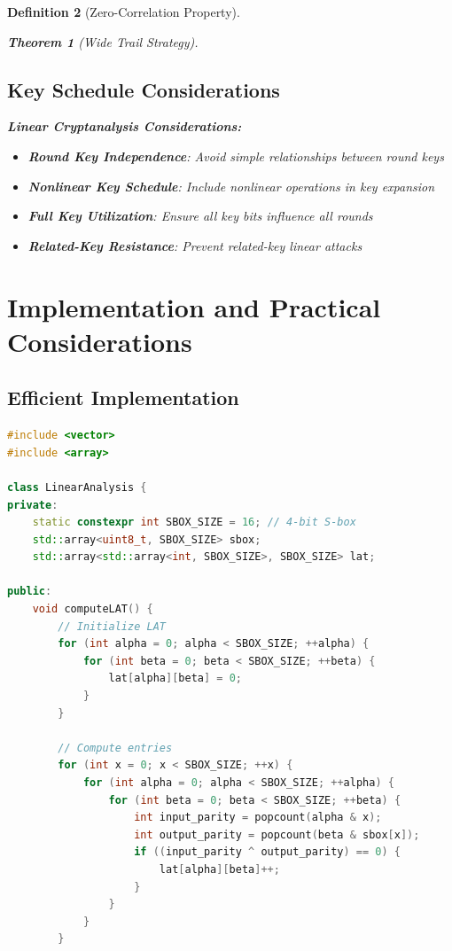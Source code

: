 \documentclass[12pt,a4paper]{article}
\newtheorem{theorem}{Theorem}[section]
\newtheorem{definition}[theorem]{Definition}
\begin{document}
\begin{definition}[Zero-Correlation Property]
\begin{theorem}[Wide Trail Strategy]
\subsection{Key Schedule Considerations}

\begin{defenseBox}[title=Key Schedule Security]
\textbf{Linear Cryptanalysis Considerations:}
\begin{itemize}
    \item \textbf{Round Key Independence}: Avoid simple relationships between round keys
    \item \textbf{Nonlinear Key Schedule}: Include nonlinear operations in key expansion
    \item \textbf{Full Key Utilization}: Ensure all key bits influence all rounds
    \item \textbf{Related-Key Resistance}: Prevent related-key linear attacks
\end{itemize}
\end{defenseBox}

\section{Implementation and Practical Considerations}

\subsection{Efficient Implementation}

\begin{lstlisting}[language=C++, caption=Linear Approximation Table Computation]
#include <vector>
#include <array>

class LinearAnalysis {
private:
    static constexpr int SBOX_SIZE = 16; // 4-bit S-box
    std::array<uint8_t, SBOX_SIZE> sbox;
    std::array<std::array<int, SBOX_SIZE>, SBOX_SIZE> lat;
    
public:
    void computeLAT() {
        // Initialize LAT
        for (int alpha = 0; alpha < SBOX_SIZE; ++alpha) {
            for (int beta = 0; beta < SBOX_SIZE; ++beta) {
                lat[alpha][beta] = 0;
            }
        }
        
        // Compute entries
        for (int x = 0; x < SBOX_SIZE; ++x) {
            for (int alpha = 0; alpha < SBOX_SIZE; ++alpha) {
                for (int beta = 0; beta < SBOX_SIZE; ++beta) {
                    int input_parity = popcount(alpha & x);
                    int output_parity = popcount(beta & sbox[x]);
                    if ((input_parity ^ output_parity) == 0) {
                        lat[alpha][beta]++;
                    }
                }
            }
        }
        

\end{lstlisting}
\end{theorem}
\end{definition}
\end{document}
